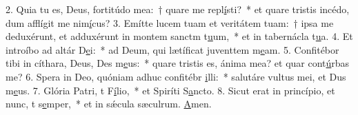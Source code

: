 2. Quia tu es, Deus, fortitúdo mea:~† quare me repl\uline{í}sti?~* et quare tristis incédo, dum afflígit me nim\uline{í}cus?
3. Emítte lucem tuam et veritátem tuam:~† ipsa me deduxérunt, et adduxérunt in montem sanctm t\uline{u}um,~* et in tabernácla t\uline{u}a.
4. Et introíbo ad altár D\uline{e}i:~* ad Deum, qui lætíficat juventtem m\uline{e}am.
5. Confitébor tibi in cíthara, Deus, Des m\uline{e}us:~* quare tristis es, ánima mea? et quar cont\uline{ú}rbas me?
6. Spera in Deo, quóniam adhuc confitébr \uline{i}lli:~* salutáre vultus mei, et Dus m\uline{e}us.
7. Glória Patri, t F\uline{í}lio,~* et Spiríti S\uline{a}ncto.
8. Sicut erat in princípio, et nunc, t s\uline{e}mper,~* et in sǽcula sæculrum. \uline{A}men.
